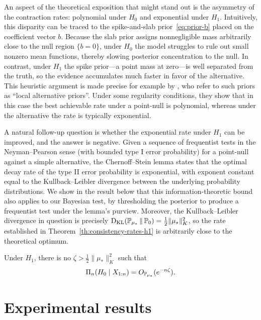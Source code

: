 An aspect of the theoretical exposition that might stand out is the asymmetry of the contraction rates: polynomial under \(H_0\) and exponential under \(H_1\). Intuitively, this disparity can be traced to the spike-and-slab prior~\eqref{eq:prior-b} placed on the coefficient vector \(b\). Because the slab prior assigns nonnegligible mass arbitrarily close to the null region \(\{b=0\}\), under \(H_0\) the model struggles to rule out small nonzero mean functions, thereby slowing posterior concentration to the null. In contrast, under \(H_1\) the spike prior---a point mass at zero---is well separated from the truth, so the evidence accumulates much faster in favor of the alternative. This heuristic argument is made precise for example by \citet{johnson2010use}, who refer to such priors as ``local alternative priors''. Under some regularity conditions, they show that in this case the best achievable rate under a point-null is polynomial, whereas under the alternative the rate is typically exponential.

A natural follow-up question is whether the exponential rate under \(H_1\) can be improved, and the answer is negative. Given a sequence of frequentist tests in the Neyman--Pearson sense (with bounded type I error probability) for a point-null against a simple alternative, the Chernoff--Stein lemma \citep[Theorem 11.8.3]{cover2006elements} states that the optimal decay rate of the type II error probability is exponential, with exponent constant equal to the Kullback--Leibler divergence between the underlying probability distributions. We show in the result below that this information-theoretic bound also applies to our Bayesian test, by thresholding the posterior to produce a frequentist test under the lemma's purview. Moreover, the Kullback--Leibler divergence in question is precisely \(\operatorname{D_{KL}}(\mathbb{P}_{\mu_*} \,\|\,\mathbb{P}_0)=\frac{1}{2}\|\mu_*\|_K^2\), so the rate established in Theorem~\ref{th:consistency-rates-h1} is arbitrarily close to the theoretical optimum.

\begin{proposition}\label{prop:optimality-rates-h1}
  Under \(H_1\), there is no \(\zeta > \frac{1}{2}\|\mu_*\|_K^2\) such that 
  \[
    \Pi_n(H_0\mid X_{1:n}) = O_{\mathbb{P}_{\mu_*}}(e^{-n\zeta}).
  \] 
\end{proposition}

\section{Experimental results}\label{sec:experiments-bft}

